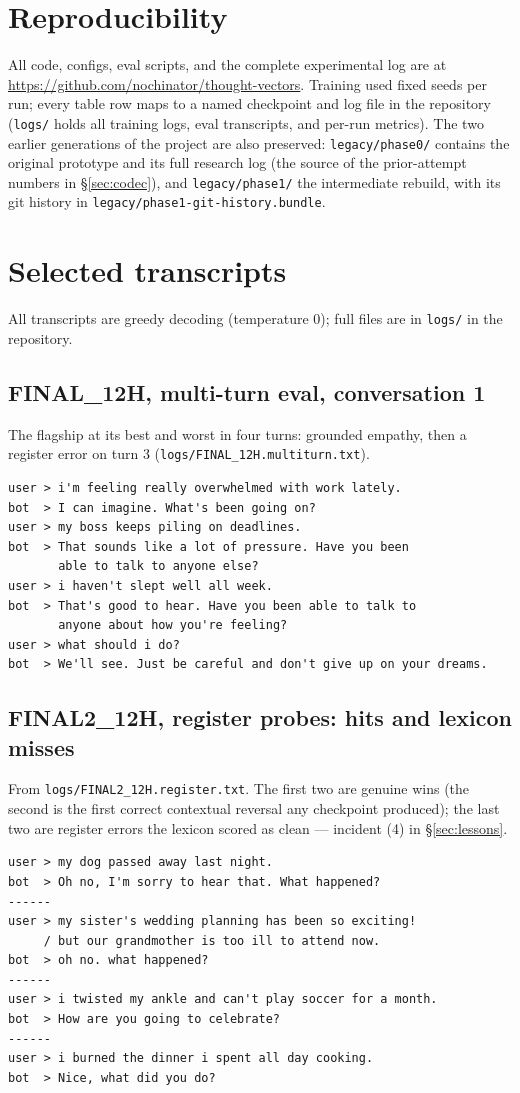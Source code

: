 \documentclass[11pt]{article}
\begin{document}
\section{Reproducibility}
All code, configs, eval scripts, and the complete experimental log are at
\url{https://github.com/nochinator/thought-vectors}. Training used fixed
seeds per run; every table row maps to a named checkpoint and log file in
the repository (\texttt{logs/} holds all training logs, eval transcripts,
and per-run metrics). The two earlier generations of the project are also
preserved: \texttt{legacy/phase0/} contains the original prototype and its
full research log (the source of the prior-attempt numbers in
\S\ref{sec:codec}), and \texttt{legacy/phase1/} the intermediate rebuild,
with its git history in \texttt{legacy/phase1-git-history.bundle}.

\section{Selected transcripts}
\label{app:transcripts}
All transcripts are greedy decoding (temperature 0); full files are in
\texttt{logs/} in the repository.

\subsection*{FINAL\_12H, multi-turn eval, conversation 1}
The flagship at its best and worst in four turns: grounded empathy, then a
register error on turn 3 (\texttt{logs/FINAL\_12H.multiturn.txt}).
\begin{verbatim}
user > i'm feeling really overwhelmed with work lately.
bot  > I can imagine. What's been going on?
user > my boss keeps piling on deadlines.
bot  > That sounds like a lot of pressure. Have you been
       able to talk to anyone else?
user > i haven't slept well all week.
bot  > That's good to hear. Have you been able to talk to
       anyone about how you're feeling?
user > what should i do?
bot  > We'll see. Just be careful and don't give up on your dreams.
\end{verbatim}

\subsection*{FINAL2\_12H, register probes: hits and lexicon misses}
From \texttt{logs/FINAL2\_12H.register.txt}. The first two are genuine wins
(the second is the first correct contextual reversal any checkpoint
produced); the last two are register errors the lexicon scored as clean ---
incident (4) in \S\ref{sec:lessons}.
\begin{verbatim}
user > my dog passed away last night.
bot  > Oh no, I'm sorry to hear that. What happened?
------
user > my sister's wedding planning has been so exciting!
     / but our grandmother is too ill to attend now.
bot  > oh no. what happened?
------
user > i twisted my ankle and can't play soccer for a month.
bot  > How are you going to celebrate?
------
user > i burned the dinner i spent all day cooking.
bot  > Nice, what did you do?
\end{verbatim}
\end{document}
